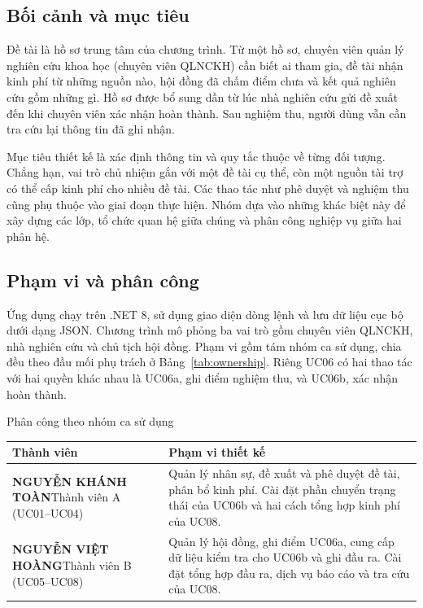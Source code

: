 \label{sec:intro}
\subsection{Bối cảnh và mục tiêu}\label{sec:context}

Đề tài là hồ sơ trung tâm của chương trình. Từ một hồ sơ, chuyên viên quản lý nghiên cứu khoa học (chuyên viên QLNCKH) cần biết ai tham gia, đề tài nhận kinh phí từ những nguồn nào, hội đồng đã chấm điểm chưa và kết quả nghiên cứu gồm những gì. Hồ sơ được bổ sung dần từ lúc nhà nghiên cứu gửi đề xuất đến khi chuyên viên xác nhận hoàn thành. Sau nghiệm thu, người dùng vẫn cần tra cứu lại thông tin đã ghi nhận.

Mục tiêu thiết kế là xác định thông tin và quy tắc thuộc về từng đối tượng. Chẳng hạn, vai trò chủ nhiệm gắn với một đề tài cụ thể, còn một nguồn tài trợ có thể cấp kinh phí cho nhiều đề tài. Các thao tác như phê duyệt và nghiệm thu cũng phụ thuộc vào giai đoạn thực hiện. Nhóm dựa vào những khác biệt này để xây dựng các lớp, tổ chức quan hệ giữa chúng và phân công nghiệp vụ giữa hai phân hệ.

\subsection{Phạm vi và phân công}\label{sec:ownership}

Ứng dụng chạy trên .NET 8, sử dụng giao diện dòng lệnh và lưu dữ liệu cục bộ dưới dạng JSON. Chương trình mô phỏng ba vai trò gồm chuyên viên QLNCKH, nhà nghiên cứu và chủ tịch hội đồng. Phạm vi gồm tám nhóm ca sử dụng, chia đều theo đầu mối phụ trách ở Bảng~\ref{tab:ownership}. Riêng UC06 có hai thao tác với hai quyền khác nhau là UC06a, ghi điểm nghiệm thu, và UC06b, xác nhận hoàn thành.

\begin{ReportTableHere}
  \centering
  \caption{Phân công theo nhóm ca sử dụng}
  \label{tab:ownership}
  \small
  \singlespacing
  \renewcommand{\arraystretch}{1.15}
  \begin{tabularx}{\linewidth}{@{}>{\raggedright\arraybackslash}p{.37\linewidth}L@{}}
    \toprule
    \textbf{Thành viên} & \textbf{Phạm vi thiết kế} \\
    \midrule
    \textbf{NGUYỄN KHÁNH TOÀN}\newline Thành viên A (UC01--UC04) & Quản lý nhân sự, đề xuất và phê duyệt đề tài, phân bổ kinh phí. Cài đặt phần chuyển trạng thái của UC06b và hai cách tổng hợp kinh phí của UC08. \\
    \textbf{NGUYỄN VIỆT HOÀNG}\newline Thành viên B (UC05--UC08) & Quản lý hội đồng, ghi điểm UC06a, cung cấp dữ liệu kiểm tra cho UC06b và ghi đầu ra. Cài đặt tổng hợp đầu ra, dịch vụ báo cáo và tra cứu của UC08. \\
    \bottomrule
  \end{tabularx}
\end{ReportTableHere}

